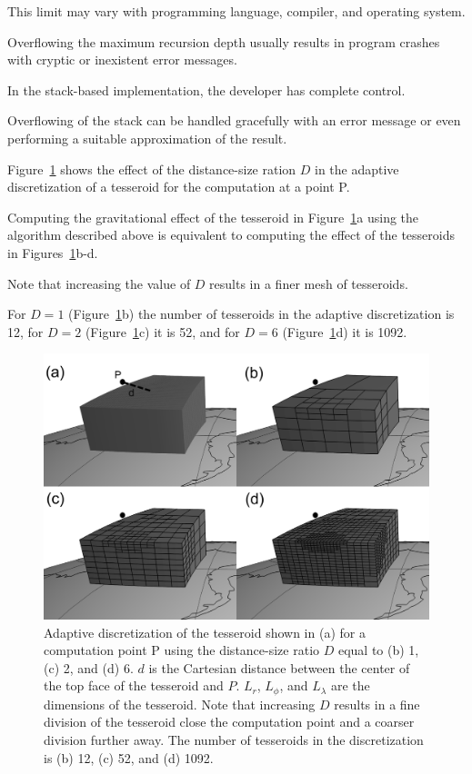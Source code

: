 \documentclass[paper,twocolumn]{geophysics}
\begin{document}
This limit may vary with programming language, compiler, and operating system.

Overflowing the maximum recursion depth usually results in program
crashes with cryptic or inexistent error messages.

In the stack-based implementation, the developer has complete control.

Overflowing of the stack can be handled gracefully with an error message or
even performing a suitable approximation of the result.



Figure~\ref{fig:division} shows the effect of the distance-size ration $D$
in the adaptive discretization of a tesseroid for the computation at a point P.

Computing the gravitational effect of the tesseroid in
Figure~\ref{fig:division}a using the algorithm described above
is equivalent to computing the effect of the tesseroids in
Figures~\ref{fig:division}b-d.

Note that increasing the value of $D$ results in a finer mesh of tesseroids.

For $D = 1$ (Figure~\ref{fig:division}b) the number of tesseroids in the
adaptive discretization is 12,
for $D = 2$ (Figure~\ref{fig:division}c) it is 52,
and for $D = 6$ (Figure~\ref{fig:division}d) it is 1092.


\begin{figure}
    \centering
    \includegraphics{figs/tesseroid-split}
    \caption{
        Adaptive discretization
        of the tesseroid shown in (a)
        for a computation point P
        using the distance-size ratio $D$ equal to
        (b) 1, (c) 2, and (d) 6.
        $d$ is the Cartesian distance between
        the center of the top face of the tesseroid
        and $P$.
        $L_r$, $L_\phi$, and $L_\lambda$ are the dimensions of the tesseroid.
        Note that increasing $D$
        results in a fine division of the tesseroid
        close the computation point
        and a coarser division further away.
        The number of tesseroids in the discretization is (b) 12, (c) 52,
        and (d) 1092.
    }
    \label{fig:division}
\end{figure}
\end{document}
